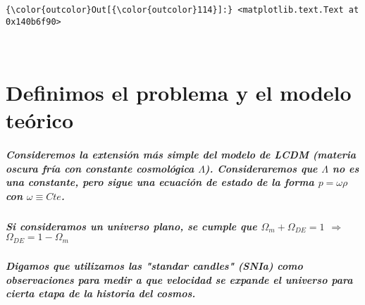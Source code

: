 \documentclass[11pt]{article}
\begin{document}
\begin{Verbatim}[commandchars=\\\{\}]
{\color{outcolor}Out[{\color{outcolor}114}]:} <matplotlib.text.Text at 0x140b6f90>
\end{Verbatim}
            
    \begin{center}
    \end{center}
    { \hspace*{\fill} \\}
    
    \section{Definimos el problema y el modelo
teórico}\label{definimos-el-problema-y-el-modelo-teuxf3rico}

    \subparagraph{\texorpdfstring{Consideremos la extensión más simple del
modelo de LCDM (materia oscura fría con constante cosmológica
\(\Lambda\)). Consideraremos que \(\Lambda\) no es una constante, pero
sigue una ecuación de estado de la forma \(p=\omega\rho\) con
\(\omega\equiv Cte\).}{Consideremos la extensión más simple del modelo de LCDM (materia oscura fría con constante cosmológica \textbackslash{}Lambda). Consideraremos que \textbackslash{}Lambda no es una constante, pero sigue una ecuación de estado de la forma p=\textbackslash{}omega\textbackslash{}rho con \textbackslash{}omega\textbackslash{}equiv Cte.}}\label{consideremos-la-extensiuxf3n-muxe1s-simple-del-modelo-de-lcdm-materia-oscura-fruxeda-con-constante-cosmoluxf3gica-lambda.-consideraremos-que-lambda-no-es-una-constante-pero-sigue-una-ecuaciuxf3n-de-estado-de-la-forma-pomegarho-con-omegaequiv-cte.}

\subparagraph{\texorpdfstring{Si consideramos un universo plano, se
cumple que \(\Omega_m+\Omega_{DE}=1\) \(\Rightarrow\)
\(\Omega_{DE}=1-\Omega_m\)}{Si consideramos un universo plano, se cumple que \textbackslash{}Omega\_m+\textbackslash{}Omega\_\{DE\}=1 \textbackslash{}Rightarrow \textbackslash{}Omega\_\{DE\}=1-\textbackslash{}Omega\_m}}\label{si-consideramos-un-universo-plano-se-cumple-que-omega_momega_de1-rightarrow-omega_de1-omega_m}

\subparagraph{Digamos que utilizamos las "standar candles" (SNIa) como
observaciones para medir a que velocidad se expande el universo para
cierta etapa de la historia del
cosmos.}\label{digamos-que-utilizamos-las-standar-candles-snia-como-observaciones-para-medir-a-que-velocidad-se-expande-el-universo-para-cierta-etapa-de-la-historia-del-cosmos.}
\end{document}

